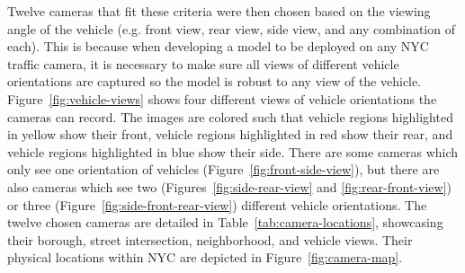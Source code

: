 Twelve cameras that fit these criteria were then chosen based on the viewing 
angle of the vehicle (e.g. front view, rear view, side view, and any
combination of each). This is because when developing a model to be deployed 
on any NYC traffic camera, it is necessary to make sure all views of different 
vehicle orientations are captured so the model is robust to any view of the vehicle.
Figure~\ref{fig:vehicle-views} shows four different views of vehicle orientations the cameras can 
record. The images are colored such that vehicle regions highlighted in yellow show 
their front, vehicle regions highlighted in red show their rear, and vehicle regions highlighted
in blue show their side. There are some cameras which only see one orientation 
of vehicles (Figure~\ref{fig:front-side-view}), but there are also cameras which see two 
(Figures~\ref{fig:side-rear-view} and \ref{fig:rear-front-view}) or three 
(Figure~\ref{fig:side-front-rear-view}) different vehicle orientations. The twelve
chosen cameras are detailed in Table~\ref{tab:camera-locations}, showcasing their
borough, street intersection, neighborhood, and vehicle views. Their physical 
locations within NYC are depicted in Figure~\ref{fig:camera-map}.


